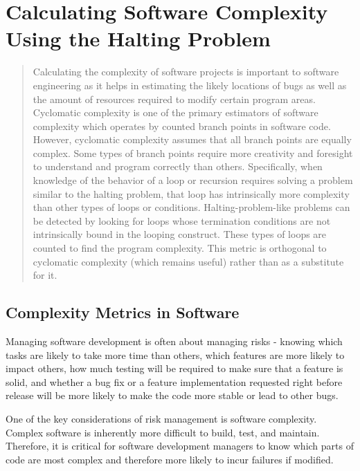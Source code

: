 \chapter[Calculating Software Complexity]{Calculating Software Complexity Using the Halting Problem}
\author{Jonathan Bartlett}

\begin{abstract}
Calculating the complexity of software projects is important to software engineering as it helps in estimating the likely locations of bugs as well as the amount of resources required to modify certain program areas.  Cyclomatic complexity is one of the primary estimators of software complexity which operates by counted branch points in software code.  However, cyclomatic complexity assumes that all branch points are equally complex.  Some types of branch points require more creativity and foresight to understand and program correctly than others.  Specifically, when knowledge of the behavior of a loop or recursion requires solving a problem similar to the halting problem, that loop has intrinsically more complexity than other types of loops or conditions.  Halting-problem-like problems can be detected by looking for loops whose termination conditions are not intrinsically bound in the looping construct.  These types of loops are counted to find the program complexity.  This metric is orthogonal to cyclomatic complexity (which remains useful) rather than as a substitute for it.
\end{abstract}

\section{Complexity Metrics in Software}

Managing software development is often about managing risks - knowing which tasks are likely to take more time than others, which features are more likely to impact others, how much testing will be required to make sure that a feature is solid, and whether a bug fix or a feature implementation requested right before release will be more likely to make the code more stable or lead to other bugs.

One of the key considerations of risk management is software complexity.  Complex software is inherently more difficult to build, test, and maintain.  Therefore, it is critical for software development managers to know which parts of code are most complex and therefore more likely to incur failures if modified.

